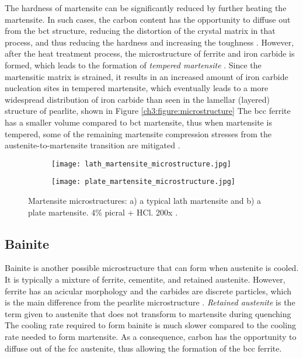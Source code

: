 The hardness of martensite can be significantly reduced by further heating the martensite. In such cases, the carbon content has the opportunity to diffuse out from the bct structure, reducing the distortion of the crystal matrix in that process, and thus reducing the hardness and increasing the toughness \cite{bhadeshia2017steels}. However, after the heat treatment process, the microstructure of ferrite and iron carbide is formed, which leads to the formation of \emph{tempered martensite} \cite{bajaj2020steels}. Since the martensitic matrix is strained, it results in an increased amount of iron carbide nucleation sites in tempered martensite, which eventually leads to a more widespread distribution of iron carbide than seen in the lamellar (layered) structure of pearlite, shown in Figure \ref{ch3:figure:microstructure} \cite{bajaj2020steels} The bcc ferrite has a smaller volume compared to bct martensite, thus when martensite is tempered, some of the remaining martensite compression stresses from the austenite-to-martensite transition are mitigated \cite{molabe2018determining}.

\begin{figure}[H]
\centering

\begin{subfigure}{.45\textwidth}
    \centering
    \texttt{[image: lath\_martensite\_microstructure.jpg]}
    \caption{}
\end{subfigure}
\begin{subfigure}{.45\textwidth}
    \centering
    \texttt{[image: plate\_martensite\_microstructure.jpg]}
    \caption{}
\end{subfigure}

\caption{Martensite microstructures: a) a typical lath martensite and b) a plate martensite. 4\% picral + HCl. 200x \cite{molabe2018determining}.}
\label{ch3:figure:martensite:microstructures}
\end{figure}

\subsection{Bainite}
Bainite is another possible microstructure that can form when austenite is cooled. It is typically a mixture of ferrite, cementite, and retained austenite. However, ferrite has an acicular morphology and the carbides are discrete particles, which is the main difference from the pearlite microstructure \cite{molabe2018determining}. \emph{Retained austenite} is the term given to austenite that does not transform to martensite during quenching \cite{bajaj2020steels} The cooling rate required to form bainite is much slower compared to the cooling rate needed to form martensite. As a consequence, carbon has the opportunity to diffuse out of the fcc austenite, thus allowing the formation of the \acrshort{bcc} ferrite.

